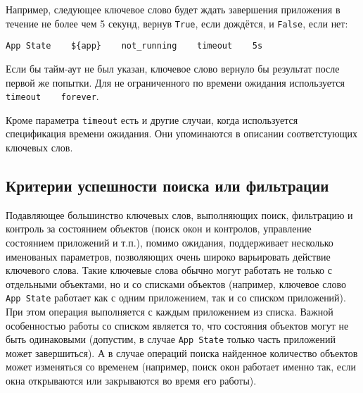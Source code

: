 \documentclass[11pt]{book} %
\begin{document}
Например, следующее ключевое слово будет ждать завершения приложения в течение не более чем 5 секунд, вернув \verb|True|, если дождётся, и \verb|False|, если нет:
\begin{verbatim}
App State    ${app}    not_running    timeout    5s
\end{verbatim}

Если бы тайм-аут не был указан, ключевое слово вернуло бы результат после первой же попытки. Для не ограниченного по времени ожидания используется \verb|timeout    forever|.

Кроме параметра \verb|timeout| есть и другие случаи, когда используется спецификация времени ожидания. Они упоминаются в описании соответстующих ключевых слов.


\subsection{Критерии успешности поиска или фильтрации}
Подавляющее большинство ключевых слов, выполняющих поиск, фильтрацию и контроль за состоянием объектов (поиск окон и контролов, управление состоянием приложений и т.п.), помимо ожидания, поддерживает несколько именованых параметров, позволяющих очень широко варьировать действие ключевого слова. Такие ключевые слова обычно могут работать не только с отдельными объектами, но и со списками объектов (например, ключевое слово \verb|App State| работает как с одним приложением, так и со списком приложений). При этом операция выполняется с каждым приложением из списка. Важной особенностью работы со списком является то, что состояния объектов могут не быть одинаковыми (допустим, в случае \verb|App State| только часть приложений может завершиться). А в случае операций поиска найденное количество объектов может изменяться со временем (например, поиск окон работает именно так, если окна открываются или закрываются во время его работы).
\end{document}
